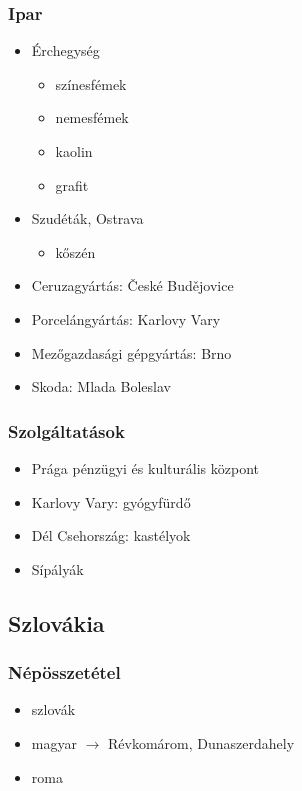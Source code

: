 \documentclass{article}
\begin{document}
\subsubsection{Ipar}
\begin{itemize} 
    \item Érchegység 
    
    \begin{itemize}
        \item színesfémek
        \item nemesfémek
        \item kaolin
        \item grafit
    \end{itemize}
    
    \item Szudéták, Ostrava

    \begin{itemize}
        \item kőszén
    \end{itemize}

    \item Ceruzagyártás: České Budějovice
    \item Porcelángyártás: Karlovy Vary
    \item Mezőgazdasági gépgyártás: Brno
    \item Skoda: Mlada Boleslav
\end{itemize}

\subsubsection{Szolgáltatások}
\begin{itemize}
    \item Prága pénzügyi és kulturális központ
    \item Karlovy Vary: gyógyfürdő
    \item Dél Csehország: kastélyok
    \item Sípályák
\end{itemize}

\subsection{Szlovákia}
\subsubsection{Népösszetétel}
\begin{itemize}
    \item szlovák
    \item magyar $\rightarrow$ Révkomárom, Dunaszerdahely
    \item roma
\end{itemize}
\end{document}

